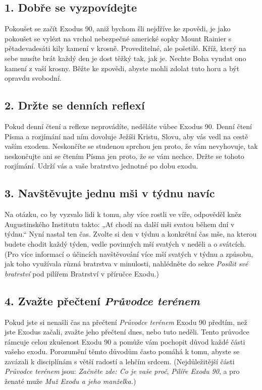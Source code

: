 \documentclass[11pt]{article}
\begin{document}
\subsection*{1. Dobře se vyzpovídejte}
Pokoušet se začít Exodus 90, aniž bychom šli nejdříve ke zpovědi, je jako pokoušet se vylézt na vrchol nebezpečné americké sopky Mount Rainier s pětadevadesáti kily kamení v krosně. Proveditelné, ale pošetilé. Kříž, který na sebe musíte brát každý den je dost těžký tak, jak je. Nechte Boha vyndat ono kamení z vaší krosny. Běžte ke zpovědi, abyste mohli zdolat tuto horu a být opravdu svobodní.
\subsection*{2. Držte se denních reflexí}
Pokud denní čtení a reflexe neprovádíte, neděláte vůbec Exodus 90. Denní čtení Písma a rozjímání nad ním dovoluje Ježíši Kristu, Slovu, aby vás vedl na cestě vaším exodem. Neskončíte se studenou sprchou jen proto, že vám nevyhovuje, tak neskončujte ani se čtením Písma jen proto, že se vám nechce. Držte se tohoto rozjímání. Udrží vás a vaše bratrstvo jednotné po dobu exodu.
\subsection*{3. Navštěvujte jednu mši v týdnu navíc}
Na otázku, co by vyzvalo lidi k tomu, aby více rostli ve víře, odpověděl kněz Augustinského Institutu takto: „Ať chodí na další mši svatou během dní v týdnu.“ Nyní nastal ten čas. Zvolte si den v týdnu a konkrétní čas mše, na kterou budete chodit každý týden, vedle povinných mší svatých v neděli a o svátcích. (Pro více informací o účincích navštěvování více mší svatých v týdnu a způsobu, jak toho využívala různá bratrstva v minulosti, nahlédněte do sekce \textit{Posílit své bratrství} pod pilířem Bratrství v příručce Exodu.)
\subsection*{4. Zvažte přečtení \textit{Průvodce terénem}}
Pokud jste si nenašli čas na přečtení \textit{Průvodce terénem} Exodu 90 předtím, než jste Exodus začali, zvažte jeho přečtení dnes, nebo tuto neděli. Tento průvodce rámcuje celou zkušenost Exodu 90 a pomůže vám pochopit důvod každé části vašeho exodu. Porozumění těmto důvodům často pomáhá k tomu, abyste se zavázali k disciplínám s větší radostí a lehčím srdcem. (Nejdůležitější části \textit{Průvodce terénem} jsou: \textit{Začněte zde: Co je vaše proč}, \textit{Pilíře Exodu 90}, a pro ženaté muže \textit{Muž Exodu a jeho manželka.})
\end{document}
